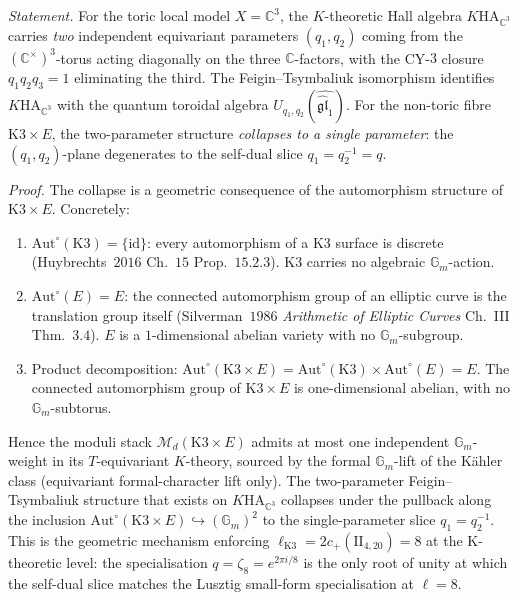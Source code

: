 \begin{proposition}
\label{prop:tcy3-parameter-collapse}
\emph{Statement.} For the toric local model $X = \mathbb{C}^3$, the
$K$-theoretic Hall algebra $K\mathrm{HA}_{\mathbb{C}^3}$ carries
\emph{two} independent equivariant parameters $(q_1, q_2)$ coming from
the $(\mathbb{C}^\times)^3$-torus acting diagonally on the three
$\mathbb{C}$-factors, with the CY-$3$ closure $q_1 q_2 q_3 = 1$
eliminating the third. The Feigin--Tsymbaliuk isomorphism identifies
$K\mathrm{HA}_{\mathbb{C}^3}$ with the quantum toroidal algebra
$U_{q_1, q_2}(\widehat{\widehat{\mathfrak{gl}}_1})$. For the
non-toric fibre $\mathrm{K3}\times E$, the two-parameter structure
\emph{collapses to a single parameter}: the $(q_1, q_2)$-plane
degenerates to the self-dual slice $q_1 = q_2^{-1} = q$.

\emph{Proof.} The collapse is a geometric consequence of the
automorphism structure of $\mathrm{K3}\times E$. Concretely:
\begin{enumerate}[label=\textup{(\roman*)}]
\item $\mathrm{Aut}^\circ(\mathrm{K3}) = \{\mathrm{id}\}$: every
automorphism of a K3 surface is discrete (Huybrechts~$2016$ Ch.~$15$
Prop.~$15.2.3$). K3 carries no algebraic $\mathbb{G}_m$-action.
\item $\mathrm{Aut}^\circ(E) = E$: the connected automorphism group
of an elliptic curve is the translation group itself
(Silverman~$1986$ \emph{Arithmetic of Elliptic Curves} Ch.~III Thm.~$3.4$).
$E$ is a $1$-dimensional abelian variety with no $\mathbb{G}_m$-subgroup.
\item Product decomposition: $\mathrm{Aut}^\circ(\mathrm{K3}\times E)
= \mathrm{Aut}^\circ(\mathrm{K3}) \times \mathrm{Aut}^\circ(E) = E$.
The connected automorphism group of $\mathrm{K3}\times E$ is
one-dimensional abelian, with no $\mathbb{G}_m$-subtorus.
\end{enumerate}
Hence the moduli stack $\mathcal{M}_d(\mathrm{K3}\times E)$ admits at
most one independent $\mathbb{G}_m$-weight in its $T$-equivariant
$K$-theory, sourced by the formal $\mathbb{G}_m$-lift of the K\"ahler
class (equivariant formal-character lift only). The two-parameter
Feigin--Tsymbaliuk structure that exists on
$K\mathrm{HA}_{\mathbb{C}^3}$ collapses under the pullback along
the inclusion $\mathrm{Aut}^\circ(\mathrm{K3}\times E)
\hookrightarrow (\mathbb{G}_m)^2$ to the single-parameter slice
$q_1 = q_2^{-1}$. This is the geometric mechanism enforcing
$\ell_{\mathrm{K3}} = 2 c_+(\mathrm{II}_{4,20}) = 8$ at the
K-theoretic level: the specialisation $q = \zeta_8 = e^{2\pi i/8}$
is the only root of unity at which the self-dual slice matches the
Lusztig small-form specialisation at $\ell = 8$.


\end{proposition}
